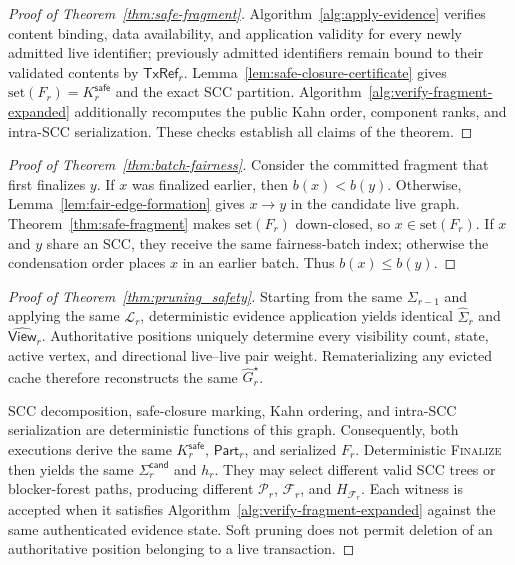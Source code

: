 \begin{proof}[Proof of Theorem~\ref{thm:safe-fragment}]
Algorithm~\ref{alg:apply-evidence} verifies content binding, data availability,
and application validity for every newly admitted live identifier; previously
admitted identifiers remain bound to their validated contents by
$\mathsf{TxRef}_r$.  Lemma~\ref{lem:safe-closure-certificate} gives
$\mathrm{set}(F_r)=K_r^{\mathsf{safe}}$ and the exact SCC partition.
Algorithm~\ref{alg:verify-fragment-expanded} additionally recomputes the public
Kahn order, component ranks, and intra-SCC serialization.  These checks
establish all claims of the theorem.
\end{proof}

\begin{proof}[Proof of Theorem~\ref{thm:batch-fairness}]
Consider the committed fragment that first finalizes $y$.  If $x$ was
finalized earlier, then $b(x)<b(y)$.  Otherwise,
Lemma~\ref{lem:fair-edge-formation} gives $x\to y$ in the candidate live
graph.  Theorem~\ref{thm:safe-fragment} makes $\mathrm{set}(F_r)$ down-closed,
so $x\in\mathrm{set}(F_r)$.  If $x$ and $y$ share an SCC, they receive the same
fairness-batch index; otherwise the condensation order places $x$ in an earlier batch.
Thus $b(x)\le b(y)$.
\end{proof}

\begin{proof}[Proof of Theorem~\ref{thm:pruning_safety}]
Starting from the same $\Sigma_{r-1}$ and applying the same $\mathcal L_r$, deterministic evidence application yields identical $\widehat\Sigma_r$ and $\widehat{\mathsf{View}}_r$.  Authoritative positions uniquely determine every visibility count, state, active vertex, and directional live--live pair
weight.  Rematerializing any evicted cache therefore reconstructs the same
$\widehat G_r^\star$.

SCC decomposition, safe-closure marking, Kahn ordering, and intra-SCC serialization are deterministic functions of this graph.  Consequently, both
executions derive the same $K_r^{\mathsf{safe}}$, $\mathsf{Part}_r$, and
serialized $F_r$.  Deterministic \textsc{Finalize} then yields the same
$\Sigma_r^{\mathsf{cand}}$ and $h_r$.  They
may select different valid SCC trees or blocker-forest paths, producing different $\mathcal P_r$,
$\mathcal F_r$, and $H_{\mathcal F_r}$.  Each witness is accepted when it
satisfies Algorithm~\ref{alg:verify-fragment-expanded} against the same
authenticated evidence state.  Soft pruning does not permit deletion of an
authoritative position belonging to a live transaction.
\end{proof}

